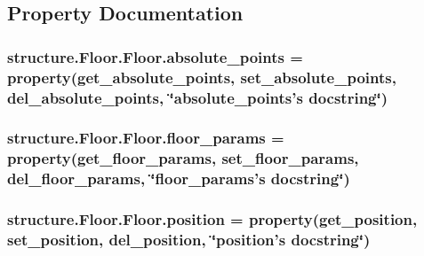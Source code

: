 \subsection{Property Documentation}
\hypertarget{classstructure_1_1_floor_1_1_floor_abe5a9d357004efc3e677267dbdd5043a}{
\subsubsection[{absolute\-\_\-points}]{\setlength{\rightskip}{0pt plus 5cm}structure.\-Floor.\-Floor.\-absolute\-\_\-points = property({\bf get\-\_\-absolute\-\_\-points}, {\bf set\-\_\-absolute\-\_\-points}, {\bf del\-\_\-absolute\-\_\-points}, \char`\"{}absolute\-\_\-points's docstring\char`\"{})\hspace{0.3cm}{\ttfamily [static]}}}\label{classstructure_1_1_floor_1_1_floor_abe5a9d357004efc3e677267dbdd5043a}
\hypertarget{classstructure_1_1_floor_1_1_floor_ae535ce99c9411ce059defea9d80257de}{
\subsubsection[{floor\-\_\-params}]{\setlength{\rightskip}{0pt plus 5cm}structure.\-Floor.\-Floor.\-floor\-\_\-params = property({\bf get\-\_\-floor\-\_\-params}, {\bf set\-\_\-floor\-\_\-params}, {\bf del\-\_\-floor\-\_\-params}, \char`\"{}floor\-\_\-params's docstring\char`\"{})\hspace{0.3cm}{\ttfamily [static]}}}\label{classstructure_1_1_floor_1_1_floor_ae535ce99c9411ce059defea9d80257de}
\hypertarget{classstructure_1_1_floor_1_1_floor_a2cab933c7de9a711dfaecc5547fe56e2}{
\subsubsection[{position}]{\setlength{\rightskip}{0pt plus 5cm}structure.\-Floor.\-Floor.\-position = property({\bf get\-\_\-position}, {\bf set\-\_\-position}, {\bf del\-\_\-position}, \char`\"{}position's docstring\char`\"{})\hspace{0.3cm}{\ttfamily [static]}}}\label{classstructure_1_1_floor_1_1_floor_a2cab933c7de9a711dfaecc5547fe56e2}
